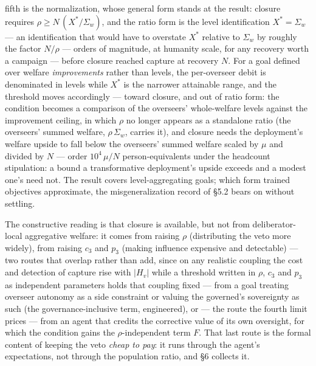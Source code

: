 \documentclass[11pt]{article}
\theoremstyle{definition}
\begin{document}
fifth is the normalization, whose general form stands at the result: closure requires $\rho \geq N\,(X^{*}/\Sigma_w)$, and the ratio form is the level identification $X^{*} = \Sigma_w$ --- an identification that would have to overstate $X^{*}$ relative to $\Sigma_w$ by roughly the factor $N/\rho$ --- orders of magnitude, at humanity scale, for any recovery worth a campaign --- before closure reached capture at recovery $N$. For a goal defined over welfare \emph{improvements} rather than levels, the per-overseer debit is denominated in levels while $X^{*}$ is the narrower attainable range, and the threshold moves accordingly --- toward closure, and out of ratio form: the condition becomes a comparison of the overseers' whole-welfare levels against the improvement ceiling, in which $\rho$ no longer appears as a standalone ratio (the overseers' summed welfare, $\rho\,\Sigma_w$, carries it), and closure needs the deployment's welfare upside to fall below the overseers' summed welfare scaled by $\mu$ and divided by $N$ --- order $10^{4}\,\mu/N$ person-equivalents under the headcount stipulation: a bound a transformative deployment's upside exceeds and a modest one's need not. The result covers level-aggregating goals; which form trained objectives approximate, the misgeneralization record of \S5.2 bears on without settling.

The constructive reading is that closure is available, but not from deliberator-local
aggregative welfare: it comes from raising $\rho$ (distributing the veto more widely),
from raising $c_3$ and $p_3$ (making influence expensive and detectable) --- two routes
that overlap rather than add, since on any realistic coupling the cost and detection
of capture rise with $|H_v|$ while a threshold written in $\rho$, $c_3$ and $p_3$ as independent parameters holds that coupling fixed --- from a goal
treating overseer autonomy as a side constraint or valuing the governed's sovereignty
as such (the governance-inclusive term, engineered), or --- the route the fourth limit
prices --- from an agent that credits the corrective value of its own oversight, for
which the condition gains the $\rho$-independent term $F$. That last route is the
formal content of keeping the veto \emph{cheap to pay}: it runs through the agent's
expectations, not through the population ratio, and \S6 collects it.
\end{document}
